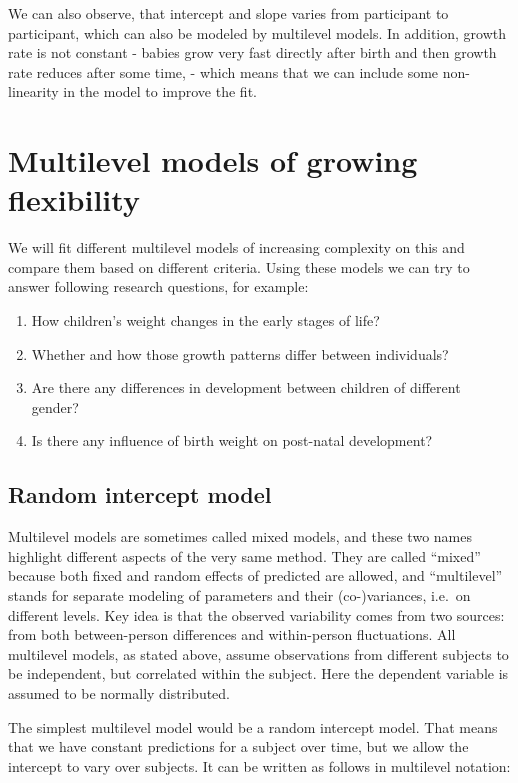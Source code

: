 \documentclass[
  12pt,
]{article}
\providecommand{\tightlist}{%
  \setlength{\itemsep}{0pt}\setlength{\parskip}{0pt}}
\begin{document}
We can also observe, that intercept and slope varies from participant to
participant, which can also be modeled by multilevel models. In
addition, growth rate is not constant - babies grow very fast directly
after birth and then growth rate reduces after some time, - which means
that we can include some non-linearity in the model to improve the fit.

\section{Multilevel models of growing
flexibility}\label{multilevel-models-of-growing-flexibility}

We will fit different multilevel models of increasing complexity on this
and compare them based on different criteria. Using these models we can
try to answer following research questions, for example:

\begin{enumerate}
\def\labelenumi{\arabic{enumi}.}
\tightlist
\item
  How children's weight changes in the early stages of life?
\item
  Whether and how those growth patterns differ between individuals?
\item
  Are there any differences in development between children of different
  gender?
\item
  Is there any influence of birth weight on post-natal development?
\end{enumerate}

\subsection{Random intercept model}\label{random-intercept-model}

Multilevel models are sometimes called mixed models, and these two names
highlight different aspects of the very same method. They are called
``mixed'' because both fixed and random effects of predicted are
allowed, and ``multilevel'' stands for separate modeling of parameters
and their (co-)variances, i.e.~on different levels. Key idea is that the
observed variability comes from two sources: from both between-person
differences and within-person fluctuations. All multilevel models, as
stated above, assume observations from different subjects to be
independent, but correlated within the subject. Here the dependent
variable is assumed to be normally distributed.

The simplest multilevel model would be a random intercept model. That
means that we have constant predictions for a subject over time, but we
allow the intercept to vary over subjects. It can be written as follows
in multilevel notation:
\end{document}
